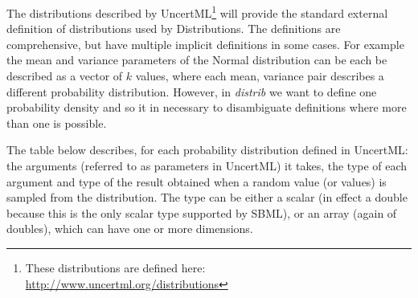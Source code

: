 \documentclass[draftspec]{sbmlpkgspec}
\newcommand{\distribshort}{\emph{distrib}\xspace}
\newcommand{\distrib}{Distributions\xspace}
\newcommand{\uncertml}{UncertML\xspace}
\begin{document}
The distributions described by \uncertml \footnote{These
  distributions are defined here:
  \url{http://www.uncertml.org/distributions}} will provide the
standard external definition of distributions used by \distrib. The
definitions are comprehensive, but have multiple implicit definitions
in some cases. For example the mean and variance parameters of the
Normal distribution can be each be described as a vector of $k$
values, where each mean, variance pair describes a different
probability distribution. However, in \distribshort we want to define
one probability density and so it in necessary to disambiguate
definitions where more than one is possible.

The table below describes, for each probability distribution defined in
\uncertml: the arguments (referred to as parameters in \uncertml) it
takes, the type of each argument and type of the result obtained when
a random value (or values) is sampled from the distribution. The type
can be either a scalar (in effect a double because this is the only
scalar type supported by SBML), or an array (again of doubles), which
can have one or more dimensions.
\end{document}
